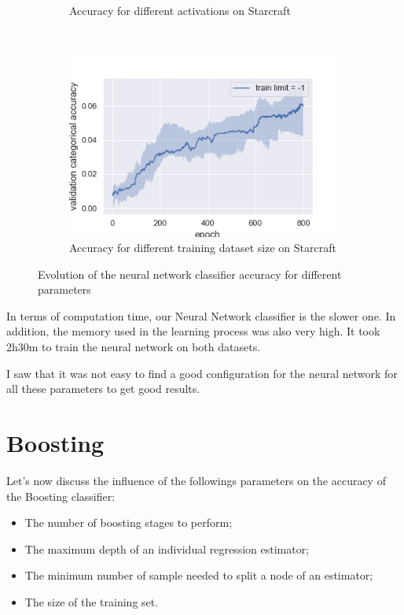 \documentclass[10pt]{article}
\begin{document}
\begin{figure}
\begin{subfigure}[]{0.45\columnwidth}
				\caption{Accuracy for different activations on Starcraft}
				\label{per_sc_act}
			\end{subfigure}~
				\begin{subfigure}[]{0.45\columnwidth}
				\centering
				\includegraphics[width=\linewidth]{../graphics/per_starcraft_epoch_score_type_train_limit.png}
				\caption{Accuracy for different training dataset size on Starcraft}
				\label{per_sc_tl}
			\end{subfigure}
			\caption{Evolution of the neural network classifier accuracy for different parameters}
			\label{per}
		\end{figure}

		In terms of computation time, our Neural Network classifier is the slower one. In addition, the memory used in the learning process was also very high. It took 2h30m to train the neural network on both datasets.

		I saw that it was not easy to find a good configuration for the neural network for all these parameters to get good results.

	\section{Boosting}
		Let's now discuss the influence of the followings parameters on the accuracy of the Boosting classifier:
		\begin{itemize}
			\item The number of boosting stages to perform;
			\item The maximum depth of an individual regression estimator;
			\item The minimum number of sample needed to split a node of an estimator;
			\item The size of the training set.
		\end{itemize}
\end{document}
